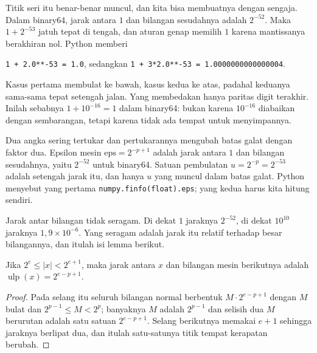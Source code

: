 Titik seri itu benar-benar muncul, dan kita bisa membuatnya dengan sengaja. Dalam
binary64, jarak antara $1$ dan bilangan sesudahnya adalah $2^{-52}$. Maka
$1+2^{-53}$ jatuh tepat di tengah, dan aturan genap memilih $1$ karena mantissanya
berakhiran nol. Python memberi

\begin{center}
\texttt{1 + 2.0**-53 = 1.0}, sedangkan \texttt{1 + 3*2.0**-53 = 1.0000000000000004}.
\end{center}

Kasus pertama membulat ke bawah, kasus kedua ke atas, padahal keduanya sama-sama tepat
setengah jalan. Yang membedakan hanya paritas digit terakhir. Inilah sebabnya
$1+10^{-16}=1$ dalam binary64: bukan karena $10^{-16}$ diabaikan dengan sembarangan,
tetapi karena tidak ada tempat untuk menyimpannya.


Dua angka sering tertukar dan pertukarannya mengubah batas galat dengan faktor dua.
Epsilon mesin $\mathrm{eps}=2^{-p+1}$ adalah jarak antara $1$ dan bilangan
sesudahnya, yaitu $2^{-52}$ untuk binary64. Satuan pembulatan
$u=2^{-p}=2^{-53}$ adalah setengah jarak itu, dan hanya $u$ yang muncul dalam batas
galat. Python menyebut yang pertama \texttt{numpy.finfo(float).eps}; yang kedua harus
kita hitung sendiri.

Jarak antar bilangan tidak seragam. Di dekat $1$ jaraknya $2^{-52}$, di dekat
$10^{10}$ jaraknya $1{,}9\times10^{-6}$. Yang seragam adalah jarak itu relatif
terhadap besar bilangannya, dan itulah isi lemma berikut.

\begin{lemma}[Ulp]
Jika $2^{e}\le|x|<2^{e+1}$, maka jarak antara $x$ dan bilangan mesin berikutnya adalah
$\operatorname{ulp}(x)=2^{e-p+1}$.
\end{lemma}

\begin{proof}
Pada selang itu seluruh bilangan normal berbentuk $M\cdot2^{e-p+1}$ dengan $M$ bulat
dan $2^{p-1}\le M<2^{p}$; banyaknya $M$ adalah $2^{p-1}$ dan selisih dua $M$
berurutan adalah satu satuan $2^{e-p+1}$. Selang berikutnya memakai $e+1$ sehingga
jaraknya berlipat dua, dan itulah satu-satunya titik tempat kerapatan berubah.
\end{proof}


